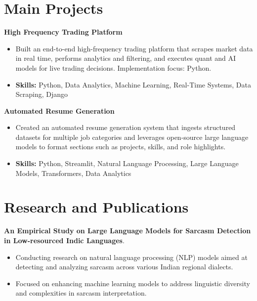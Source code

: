 \documentclass[a4paper,11pt]{article}
\begin{document}
\section{\textbf{Main Projects}}

\vspace{1mm}
  \textbf{High Frequency Trading Platform  }
\vspace{-1.5mm} %
\begin{itemize}
  \item Built an end-to-end high-frequency trading platform that scrapes market data in real time, performs analytics and filtering, and executes quant and AI models for live trading decisions. Implementation focus: Python.
\vspace{-3mm}
  \item \textbf{Skills:} Python, Data Analytics, Machine Learning, Real-Time Systems, Data Scraping, Django
\end{itemize}


\vspace{1mm}
   \textbf{Automated Resume Generation }
\vspace{-1.5mm} %
\begin{itemize}
  \item Created an automated resume generation system that ingests structured datasets for multiple job categories and leverages open-source large language models to format sections such as projects, skills, and role highlights.
\vspace{-3mm}
  \item \textbf{Skills:} Python, Streamlit, Natural Language Processing, Large Language Models, Transformers, Data Analytics
\end{itemize}



\section{\textbf{Research and Publications} \hfill }
\vspace{1mm}
  \textbf{An Empirical Study on Large Language Models for Sarcasm Detection in Low-resourced Indic Languages}.
\vspace{-1mm} %
\begin{itemize}
  \item Conducting research on natural language processing (NLP) models aimed at detecting and analyzing sarcasm across various Indian regional dialects.
\vspace{-3mm}
  \item Focused on enhancing machine learning models to address linguistic diversity and complexities in sarcasm interpretation.
\end{itemize}
\end{document}
